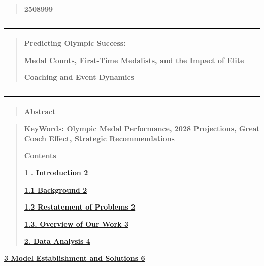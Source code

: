\documentclass[12pt,a4paper]{article}
\renewenvironment{quote}{\begin{quotation}}{\end{quotation}}  %
\begin{document}
    \begin{quote}
    \textbf{2508999}
    \end{quote}
    
    \includegraphics[width=6.22833in,height=\textheight,keepaspectratio]{./media/media/image1.jpeg}
    
    \begin{quote}
    \textbf{Predicting Olympic Success:}
    
    \textbf{Medal Counts, First-Time Medalists, and the Impact of Elite}
    
    \textbf{Coaching and Event Dynamics}
    \end{quote}
    
    \includegraphics[width=6.29833in,height=\textheight,keepaspectratio]{./media/media/image2.jpeg}
    
    \begin{quote}
    \textbf{Abstract}
    \end{quote}
    
    \textbf{}
    
    \begin{quote}
    \textbf{KeyWords: Olympic Medal Performance, 2028 Projections, Great
    Coach Effect, Strategic Recommendations}
    
    \textbf{Contents}
    
    \hyperref[bookmark24]{\textbf{1 . Introduction 2}}
    
    \hyperref[bookmark3-1]{\textbf{1.1 Background 2}}
    
    \hyperref[bookmark4-1]{\textbf{1.2 Restatement of Problems 2}}
    
    \hyperref[bookmark5-1]{\textbf{1.3. Overview of Our Work 3}}
    
    \hyperref[bookmark6-1]{\textbf{2. Data Analysis 4}}
    \end{quote}
    
    \hyperref[bookmark27]{\textbf{3 Model Establishment and Solutions 6}}
    
\end{document}
